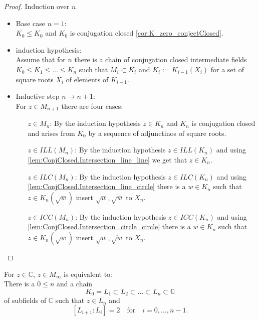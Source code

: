 \begin{proof}
\leanok
{}
Induction over $n$
\begin{itemize}
    \item Base case $n=1$: \\
        $K_0 \le K_0$ and $K_0$ is conjugation closed \ref{cor:K_zero_conjectClosed}.
    \item induction hypothesis: \\
        Assume that for $n$ there is a chain of conjugation closed  intermediate fields $K_0 \le K_1 \le \ldots \le K_n$ such that $M_i\subset K_i$ and $K_i:= K_{i-1}(X_i)$ for a set of square roots $X_i$ of elements of $K_{i-1}$.
    \item Inductive step $n \to n+1$: \\
        For $z\in M_{n+1}$ there are four cases: 
        \begin{itemize}
            \item [$z \in M_n$:] By the induction hypothesis $z \in K_n$ and $K_n$ is conjugation closed and arises from $K_0$ by a sequence of adjunctinos of square roots.
            \item [$z \in ILL (M_n)$:] By the induction hypothesis $z \in ILL (K_n)$ and using \ref{lem:ConjClosed.Intersection_line_line} we get that $z \in K_{n}$.
            \item [$z \in ILC (M_n)$:] By the induction hypothesis $z \in ILC (K_n)$ and using \ref{lem:ConjClosed.Intersection_line_circle} there is a $w \in K_n$ such that $z \in K_n(\sqrt{w})$ insert  $\sqrt{w}, \overline{\sqrt{w}}$ to $X_n$.
            \item [$z \in ICC (M_n)$:] By the induction hypothesis $z \in ICC (K_n)$ and using \ref{lem:ConjClosed.Intersection_circle_circle} there is a $w \in K_n$ such that $z \in K_n(\sqrt{w})$ insert $\sqrt{w}, \overline{\sqrt{w}}$ to $X_n$.
        \end{itemize}
\end{itemize}
\end{proof}

\begin{theorem}
    \label{thm:Classfication_z_in_M_inf}
    \leanok
    For $z \in \mathbb{C}$, $z \in M_{\infty}$ is equivalent to:\\
    There is a $0\le n$ and a chain 
    $$K_0 = L_1 \subset L_2 \subset \ldots \subset L_n \subset \mathbb{C}$$
    of subfields of $\mathbb{C}$ such that $z \in L_n$ and 
    $$ [L_{i+1}:L_i] = 2 \quad \text{for} \quad i = 0, \ldots, n-1.$$
\end{theorem}

